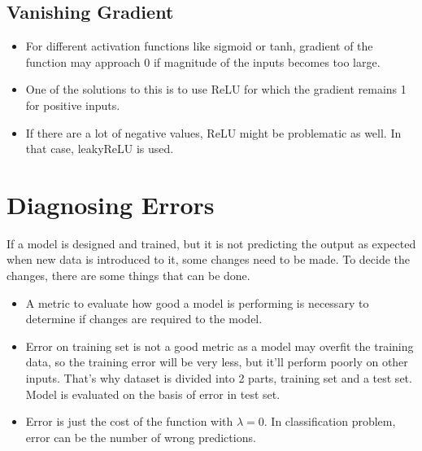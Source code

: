 \documentclass{article}
\begin{document}
	\subsection{Vanishing Gradient}\begin{itemize}
		\item For different activation functions like sigmoid or tanh, gradient of the function may approach 0 if magnitude of the inputs becomes too large.
		\item One of the solutions to this is to use ReLU for which the gradient remains 1 for positive inputs.
		\item If there are a lot of negative values, ReLU might be problematic as well. In that case, leakyReLU is used.
	\end{itemize}
\section{Diagnosing Errors}
If a model is designed and trained, but it is not predicting the output as expected when new data is introduced to it, some changes need to be made. To decide the changes, there are some things that can be done.
\begin{itemize}
	\item A metric to evaluate how good a model is performing is necessary to determine if changes are required to the model.
	\item Error on training set is not a good metric as a model may overfit the training data, so the training error will be very less, but it'll perform poorly on other inputs. That's why dataset is divided into 2 parts, training set and a test set. Model is evaluated on the basis of error in test set.
	\item Error is just the cost of the function with $\lambda=0$. In classification problem, error can be the number of wrong predictions.
\end{itemize}
\end{document}
